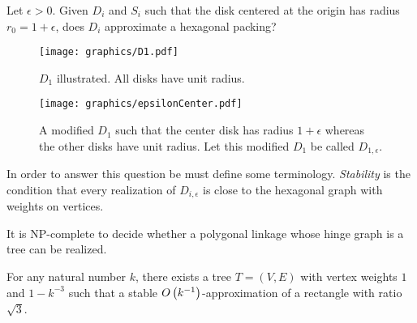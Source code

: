 \begin{prob}
Let $\epsilon > 0$.  Given $D_i$ and $S_i$ such that the disk centered at the origin has radius $r_0 = 1+\epsilon$, does $D_i$ approximate a hexagonal packing?
\end{prob}
\begin{figure}[!htbp]
\centering
\begin{minipage}{0.45\textwidth}
\centering
\texttt{[image: graphics/D1.pdf]}
\caption{$D_1$ illustrated.  All disks have unit radius.}\label{fig:D1}
\end{minipage}\hfill
\begin{minipage}{0.45\textwidth}
\centering
\texttt{[image: graphics/epsilonCenter.pdf]}
\caption{A modified $D_1$ such that the center disk has radius $1+\epsilon$ whereas the other disks have unit radius.  Let this modified $D_1$ be called $D_{1,\epsilon}$.}\label{fig:epsilonCenter}
\end{minipage}
\end{figure}
In order to answer this question be must define some terminology.  \textit{Stability} is the condition that every realization of $D_{i,\epsilon}$ is close to the hexagonal graph with weights on vertices.
\begin{thm}\label{thm:ContactGraphV3-1}
It is NP-complete to decide whether a polygonal linkage whose hinge graph is a tree can be realized.
\end{thm}
 
\begin{lem}\label{lem:ContactGraphV3-1}
For any natural number $k$,  there exists a tree $T = (V,E)$ with vertex weights $1$ and $1 - k^{-3}$ such that a stable $O\left( k^{-1} \right)$-approximation of a rectangle with ratio $\sqrt{3}$.
\end{lem}



